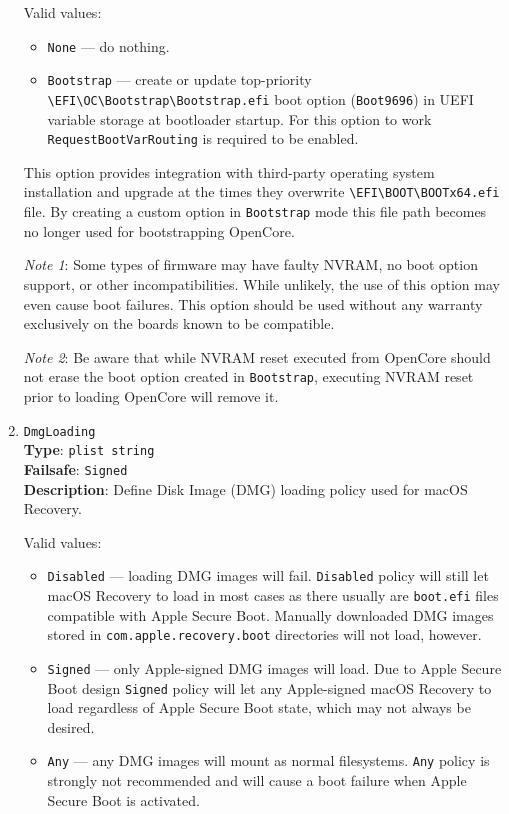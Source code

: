 \documentclass[]{article}
\providecommand{\tightlist}{%
  \setlength{\itemsep}{0pt}\setlength{\parskip}{0pt}}
\begin{document}
\begin{enumerate}
  Valid values:

  \begin{itemize}
  \tightlist
  \item \texttt{None} --- do nothing.
  \item \texttt{Bootstrap} --- create or update top-priority
  \texttt{\textbackslash EFI\textbackslash OC\textbackslash Bootstrap\textbackslash Bootstrap.efi}
  boot option (\texttt{Boot9696}) in UEFI variable storage at bootloader startup. For this option
  to work \texttt{RequestBootVarRouting} is required to be enabled.
  \end{itemize}

  This option provides integration with third-party operating system installation and upgrade
  at the times they overwrite \texttt{\textbackslash EFI\textbackslash BOOT\textbackslash BOOTx64.efi}
  file. By creating a custom option in \texttt{Bootstrap} mode this file path becomes no longer
  used for bootstrapping OpenCore.

  \emph{Note 1}: Some types of firmware may have faulty NVRAM, no boot option support, or other
  incompatibilities. While unlikely, the use of this option may even cause boot failures.
  This option should be used without any warranty exclusively on the boards known to be compatible.

  \emph{Note 2}: Be aware that while NVRAM reset executed from OpenCore should not erase the boot
  option created in \texttt{Bootstrap}, executing NVRAM reset prior to loading OpenCore will remove it.

\item \label{securedmgloading}
  \texttt{DmgLoading}\\
  \textbf{Type}: \texttt{plist\ string}\\
  \textbf{Failsafe}: \texttt{Signed}\\
  \textbf{Description}: Define Disk Image (DMG) loading policy used for macOS Recovery.

  Valid values:

  \begin{itemize}
  \tightlist
  \item \texttt{Disabled} --- loading DMG images will fail. \texttt{Disabled}
    policy will still let macOS Recovery to load in most cases as there
    usually are \texttt{boot.efi} files compatible with Apple Secure Boot.
    Manually downloaded DMG images stored in \texttt{com.apple.recovery.boot}
    directories will not load, however.
  \item \texttt{Signed} --- only Apple-signed DMG images will load. Due to
    Apple Secure Boot design \texttt{Signed} policy will let any Apple-signed
    macOS Recovery to load regardless of Apple Secure Boot state, which may
    not always be desired.
  \item \texttt{Any} --- any DMG images will mount as normal filesystems.
    \texttt{Any} policy is strongly not recommended and will cause a boot failure
    when Apple Secure Boot is activated.
  \end{itemize}


\end{enumerate}
\end{document}
